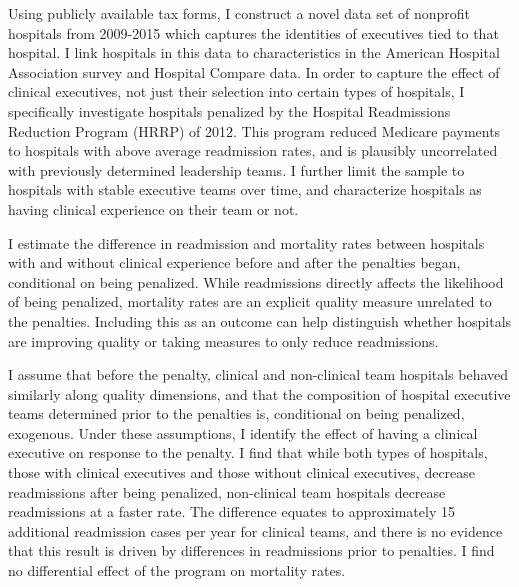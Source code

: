 \documentclass[12pt]{article}
\begin{document}
  Using publicly available tax forms, I construct a novel data set of nonprofit hospitals from 2009-2015 which captures the identities of executives tied to that hospital. I link hospitals in this data to characteristics in the American Hospital Association survey and Hospital Compare data. In order to capture the effect of clinical executives, not just their selection into certain types of hospitals, I specifically investigate hospitals penalized by the Hospital Readmissions Reduction Program (HRRP) of 2012. This program reduced Medicare payments to hospitals with above average readmission rates, and is plausibly uncorrelated with previously determined leadership teams. I further limit the sample to hospitals with stable executive teams over time, and characterize hospitals as having clinical experience on their team or not. 
  
  I estimate the difference in readmission and mortality rates between hospitals with and without clinical experience before and after the penalties began, conditional on being penalized. While readmissions directly affects the likelihood of being penalized, mortality rates are an explicit quality measure unrelated to the penalties. Including this as an outcome can help distinguish whether hospitals are improving quality or taking measures to only reduce readmissions. 
  
  I assume that before the penalty, clinical and non-clinical team hospitals behaved similarly along quality dimensions, and that the composition of hospital executive teams determined prior to the penalties is, conditional on being penalized, exogenous. Under these assumptions, I identify the effect of having a clinical executive on response to the penalty. I find that while both types of hospitals, those with clinical executives and those without clinical executives, decrease readmissions after being penalized, non-clinical team hospitals decrease readmissions at a faster rate. The difference equates to approximately 15 additional readmission cases per year for clinical teams, and there is no evidence that this result is driven by differences in readmissions prior to penalties. I find no differential effect of the program on mortality rates. 
\end{document}
